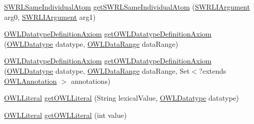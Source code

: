 \begin{DoxyCompactItemize}
\item 
\hyperlink{interfaceorg_1_1semanticweb_1_1owlapi_1_1model_1_1_s_w_r_l_same_individual_atom}{S\-W\-R\-L\-Same\-Individual\-Atom} \hyperlink{classuk_1_1ac_1_1manchester_1_1cs_1_1owl_1_1owlapi_1_1_o_w_l_data_factory_impl_a0a154b8d6964d6c50f4c2c9d01d0dd73}{get\-S\-W\-R\-L\-Same\-Individual\-Atom} (\hyperlink{interfaceorg_1_1semanticweb_1_1owlapi_1_1model_1_1_s_w_r_l_i_argument}{S\-W\-R\-L\-I\-Argument} arg0, \hyperlink{interfaceorg_1_1semanticweb_1_1owlapi_1_1model_1_1_s_w_r_l_i_argument}{S\-W\-R\-L\-I\-Argument} arg1)
\item 
\hyperlink{interfaceorg_1_1semanticweb_1_1owlapi_1_1model_1_1_o_w_l_datatype_definition_axiom}{O\-W\-L\-Datatype\-Definition\-Axiom} \hyperlink{classuk_1_1ac_1_1manchester_1_1cs_1_1owl_1_1owlapi_1_1_o_w_l_data_factory_impl_a1bd171babbe03f321168ee640355fa42}{get\-O\-W\-L\-Datatype\-Definition\-Axiom} (\hyperlink{interfaceorg_1_1semanticweb_1_1owlapi_1_1model_1_1_o_w_l_datatype}{O\-W\-L\-Datatype} datatype, \hyperlink{interfaceorg_1_1semanticweb_1_1owlapi_1_1model_1_1_o_w_l_data_range}{O\-W\-L\-Data\-Range} data\-Range)
\item 
\hyperlink{interfaceorg_1_1semanticweb_1_1owlapi_1_1model_1_1_o_w_l_datatype_definition_axiom}{O\-W\-L\-Datatype\-Definition\-Axiom} \hyperlink{classuk_1_1ac_1_1manchester_1_1cs_1_1owl_1_1owlapi_1_1_o_w_l_data_factory_impl_a1af4094c9b2c8c1a281c8e94c5a9ed13}{get\-O\-W\-L\-Datatype\-Definition\-Axiom} (\hyperlink{interfaceorg_1_1semanticweb_1_1owlapi_1_1model_1_1_o_w_l_datatype}{O\-W\-L\-Datatype} datatype, \hyperlink{interfaceorg_1_1semanticweb_1_1owlapi_1_1model_1_1_o_w_l_data_range}{O\-W\-L\-Data\-Range} data\-Range, Set$<$?extends \hyperlink{interfaceorg_1_1semanticweb_1_1owlapi_1_1model_1_1_o_w_l_annotation}{O\-W\-L\-Annotation} $>$ annotations)
\item 
\hyperlink{interfaceorg_1_1semanticweb_1_1owlapi_1_1model_1_1_o_w_l_literal}{O\-W\-L\-Literal} \hyperlink{classuk_1_1ac_1_1manchester_1_1cs_1_1owl_1_1owlapi_1_1_o_w_l_data_factory_impl_ab9d9110df45d14400400d02ead97c3ec}{get\-O\-W\-L\-Literal} (String lexical\-Value, \hyperlink{interfaceorg_1_1semanticweb_1_1owlapi_1_1model_1_1_o_w_l_datatype}{O\-W\-L\-Datatype} datatype)
\item 
\hyperlink{interfaceorg_1_1semanticweb_1_1owlapi_1_1model_1_1_o_w_l_literal}{O\-W\-L\-Literal} \hyperlink{classuk_1_1ac_1_1manchester_1_1cs_1_1owl_1_1owlapi_1_1_o_w_l_data_factory_impl_ad0dce266809347067067ee7f7c8bd01f}{get\-O\-W\-L\-Literal} (int value)
\item 

\end{DoxyCompactItemize}
